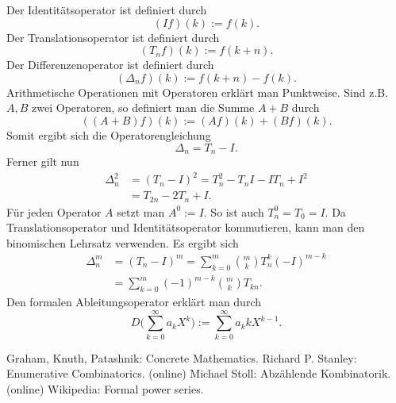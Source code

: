 \documentclass[a4paper,11pt,fleqn,twoside,twocolumn,dvipdfmx]{scrartcl}
\numberwithin{equation}{section}
\begin{document}
Der Identitätsoperator ist definiert durch
\begin{equation}
(If)(k) := f(k).
\end{equation}
Der Translationsoperator ist definiert durch
\begin{equation}
(T_n f)(k) := f(k+n).
\end{equation}
Der Differenzenoperator ist definiert durch
\begin{equation}
(\Delta_n f)(k) := f(k+n)-f(k).
\end{equation}
Arithmetische Operationen mit Operatoren erklärt man Punktweise.
Sind z.B. $A,B$ zwei Operatoren, so definiert man die Summe $A+B$
durch%
\begin{equation}
((A+B)f)(k):=(A f)(k)+(B f)(k).
\end{equation}
Somit ergibt sich die Operatorengleichung
\begin{equation}
\Delta_n = T_n-I.
\end{equation}
Ferner gilt nun
\begin{equation}
\begin{split}
\Delta_n^2 &= (T_n-I)^2
= T_n^2-T_nI-IT_n+I^2\\
&= T_{2n}-2T_n+I.
\end{split}
\end{equation}
Für jeden Operator $A$ setzt man $A^0:=I$. So ist auch $T_n^0=T_0=I$.
Da Translationsoperator und Identitätsoperator kommutieren, kann
man den binomischen Lehrsatz verwenden. Es ergibt sich%
\begin{equation}
\begin{split}
\Delta_n^m &= (T_n-I)^m
= \sum_{k=0}^m \binom{m}{k} T_n^k (-I)^{m-k}\\
&= \sum_{k=0}^m (-1)^{m-k}\binom{m}{k} T_{kn}.
\end{split}
\end{equation}
Den formalen Ableitungsoperator erklärt man durch%
\begin{equation}
D\Big(\sum_{k=0}^\infty a_kX^k\Big)
:= \sum_{k=0}^\infty a_k kX^{k-1}.
\end{equation}

\newpage
\begin{thebibliography}{10}
\setlength{\itemsep}{0pt}
 Graham, Knuth, Patashnik: Concrete Mathematics.
 Richard P. Stanley: Enumerative Combinatorics. (online)
 Michael Stoll: Abzählende Kombinatorik. (online)
 Wikipedia: Formal power series.
\end{thebibliography}
\end{document}
